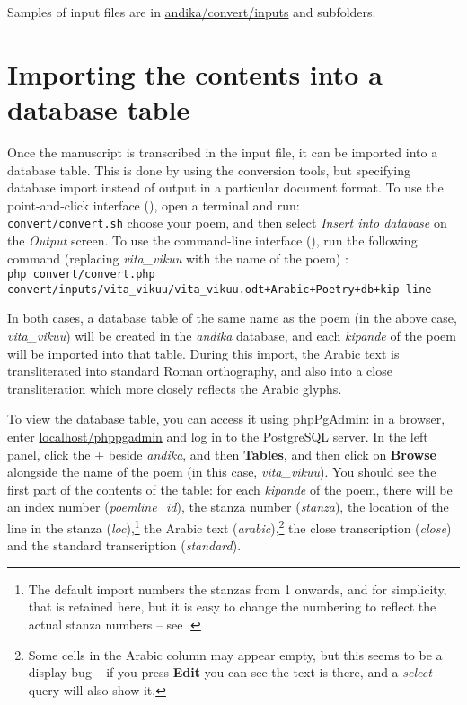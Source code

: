Samples of input files are in \url{andika/convert/inputs} and subfolders.


\section{Importing the contents into a database table}
\label{s:import}

Once the manuscript is transcribed in the input file, it can be imported into a database table.  This is done by using the conversion tools, but specifying database import instead of output in a particular document format.  To use the point-and-click interface (), open a terminal and run:\\
\verb|convert/convert.sh|
choose your poem, and then select \textit{Insert into database} on the \textit{Output} screen.  To use the command-line interface (), run the following command (replacing \textit{vita_vikuu} with the name of the poem) :\\
\verb|php convert/convert.php convert/inputs/vita_vikuu/vita_vikuu.odt+Arabic+Poetry+db+kip-line|

In both cases, a database table of the same name as the poem (in the above case, \textit{vita_vikuu}) will be created in the \textit{andika} database, and each \textit{kipande} of the poem will be imported into that table.  During this import, the Arabic text is transliterated into standard Roman orthography, and also into a close transliteration which more closely reflects the Arabic glyphs.

To view the database table, you can access it using phpPgAdmin: in a browser, enter \url{localhost/phppgadmin} and log in to the PostgreSQL server.  In the left panel, click the + beside \textit{andika}, and then \textbf{Tables}, and then click on \textbf{Browse} alongside the name of the poem (in this case, \textit{vita_vikuu}).  You should see the first part of the contents of the table: for each \textit{kipande} of the poem, there will be an index number (\textit{poemline_id}), the stanza number (\textit{stanza}), the location of the line in the stanza (\textit{loc}),\footnote{The default import numbers the stanzas from 1 onwards, and for simplicity, that is retained here, but it is easy to change the numbering to reflect the actual stanza numbers  -- see .} the Arabic text (\textit{arabic}),\footnote{Some cells in the Arabic column may appear empty, but this seems to be a display bug -- if you press \textbf{Edit} you can see the text is there, and a \textit{select} query will also show it.} the close transcription (\textit{close}) and the standard transcription (\textit{standard}).


